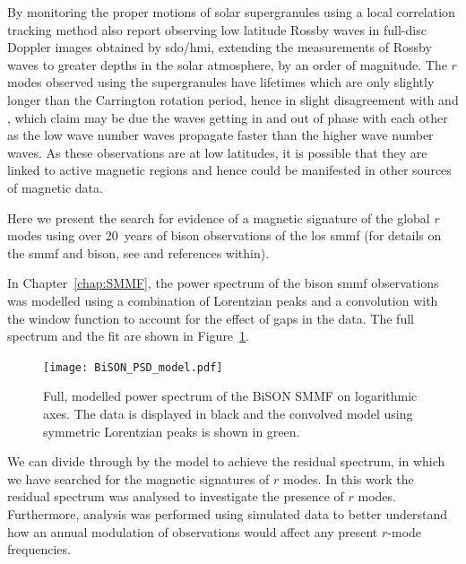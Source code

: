 By monitoring the proper motions of solar supergranules using a local correlation tracking method \citet{hathaway_hydrodynamic_2020} also report observing low latitude Rossby waves in full-disc Doppler images obtained by \gls{sdo/hmi}, extending the measurements of Rossby waves to greater depths in the solar atmosphere, by an order of magnitude. The $r$ modes observed using the supergranules have lifetimes which are only slightly longer than the Carrington rotation period, hence in slight disagreement with \citet{loptien_global-scale_2018} and \citet{liang_time-distance_2019}, which \citet{hathaway_hydrodynamic_2020} claim may be due the waves getting in and out of phase with each other as the low wave number waves propagate faster than the higher wave number waves. As these observations are at low latitudes, it is possible that they are linked to active magnetic regions and hence could be manifested in other sources of magnetic data.

Here we present the search for evidence of a magnetic signature of the global $r$ modes using over 20~years of \gls{bison} observations of the \gls{los} \gls{smmf} (for details on the \gls{smmf} and \gls{bison}, see \citet{chaplin_studies_2003} and references within).

In Chapter~\ref{chap:SMMF}, the power spectrum of the \gls{bison}  \gls{smmf} observations was modelled using a combination of Lorentzian peaks and a convolution with the window function to account for the effect of gaps in the data. The full spectrum and the fit are shown in Figure~\ref{fig:BiSON_PSD}.



\begin{figure}[ht!]
	\centering
	\texttt{[image: BiSON\_PSD\_model.pdf]}
	\caption{Full, modelled power spectrum of the BiSON SMMF on logarithmic axes. The data is displayed in black and the convolved model using symmetric Lorentzian peaks is shown in green.}
	\label{fig:BiSON_PSD}
\end{figure}

We can divide through by the model to achieve the residual spectrum, in which we have searched for the magnetic signatures of $r$ modes. In this work the residual spectrum was analysed to investigate the presence of $r$ modes. Furthermore, analysis was performed using simulated data to better understand how an annual modulation of observations would affect any present $r$-mode frequencies. 

